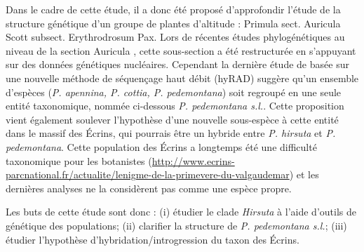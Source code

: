 Dans le cadre de cette étude, il a donc été proposé d'approfondir l'étude de la structure génétique d'un groupe de plantes d'altitude : Primula sect. Auricula Scott subsect. Erythrodrosum Pax. %
 Lors de récentes études phylogénétiques au niveau de la section Auricula \citep{Zhang2004,Zhang2004a, Boucher2016a}, cette sous-section a été restructurée en s'appuyant sur des données génétiques nucléaires.
 Cependant la dernière étude de \citet{Boucher2016a} basée sur une nouvelle méthode de séquençage haut débit (hyRAD) suggère qu'un ensemble d'espèces (\textit{P. apennina, P. cottia, P. pedemontana}) soit regroupé en une seule entité taxonomique, nommée ci-dessous \textit{P. pedemontana s.l.}.
 Cette proposition vient également soulever l'hypothèse d'une nouvelle sous-espèce à cette entité dans le massif des Écrins, qui pourrais être un hybride entre \textit{P. hirsuta} et \textit{P. pedemontana}.
 Cette population des Écrins a longtemps été une difficulté taxonomique pour les botanistes (\url{http://www.ecrins-parcnational.fr/actualite/lenigme-de-la-primevere-du-valgaudemar}) et les dernières analyses ne la considèrent pas comme une espèce propre.

Les buts de cette étude sont donc : (i) étudier le clade \textit{Hirsuta} à l'aide d'outils de génétique des populations; (ii) clarifier la structure de \textit{P. pedemontana s.l.}; (iii) étudier l'hypothèse d'hybridation/introgression du taxon des Écrins.


